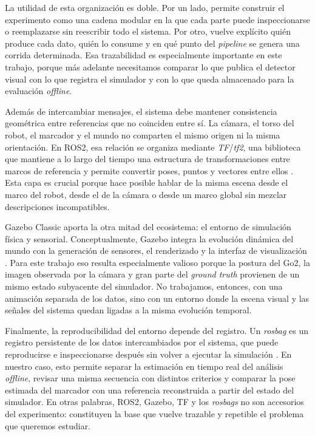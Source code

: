 \documentclass[12pt,a4paper]{report}
\begin{document}
La utilidad de esta organización es doble. Por un lado, permite construir el
experimento como una cadena modular en la que cada parte puede inspeccionarse o
reemplazarse sin reescribir todo el sistema. Por otro, vuelve explícito quién
produce cada dato, quién lo consume y en qué punto del \textit{pipeline} se genera una
corrida determinada. Esa trazabilidad es especialmente importante en este trabajo,
porque más adelante necesitamos comparar lo que publica el detector visual con
lo que registra el simulador y con lo que queda almacenado para la evaluación
\textit{offline}.

Además de intercambiar mensajes, el sistema debe mantener consistencia
geométrica entre referencias que no coinciden entre sí. La cámara, el torso del
robot, el marcador y el mundo no comparten el mismo origen ni la misma
orientación. En ROS2, esa relación se organiza mediante \emph{TF}/\emph{tf2},
una biblioteca que mantiene a lo largo del tiempo una estructura de
transformaciones entre marcos de referencia y permite convertir poses, puntos y
vectores entre ellos \citep{tf2_humble}. Esta capa es crucial porque hace
posible hablar de la misma escena desde el marco del robot, desde el de la
cámara o desde un marco global sin mezclar descripciones incompatibles.

Gazebo Classic aporta la otra mitad del ecosistema: el entorno de simulación
física y sensorial. Conceptualmente, Gazebo integra la evolución dinámica del
mundo con la generación de sensores, el renderizado y la interfaz de
visualización \citep{gazebo_classic_architecture}. Para este trabajo eso resulta
especialmente valioso porque la postura del Go2, la imagen observada por la
cámara y gran parte del \textit{ground truth} provienen de un mismo estado subyacente
del simulador. No trabajamos, entonces, con una animación separada de los
datos, sino con un entorno donde la escena visual y las señales del sistema
quedan ligadas a la misma evolución temporal.

Finalmente, la reproducibilidad del entorno depende del registro. Un
\emph{rosbag} es un registro persistente de los datos intercambiados por el
sistema, que puede reproducirse e inspeccionarse después sin volver a ejecutar
la simulación \citep{ros2_rosbag2_tutorial}. En nuestro caso, esto permite
separar la estimación en tiempo real del análisis \textit{offline}, revisar una misma
secuencia con distintos criterios y comparar la pose estimada del marcador con
una referencia reconstruida a partir del estado del simulador. En otras
palabras, ROS2, Gazebo, TF y los \emph{rosbags} no son accesorios del experimento:
constituyen la base que vuelve trazable y repetible el problema que queremos
estudiar.
\end{document}
